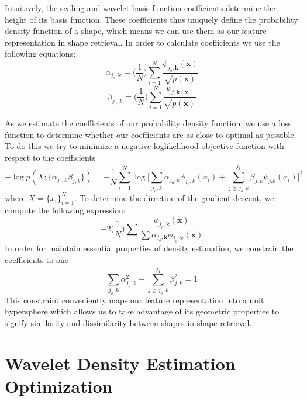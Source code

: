 \documentclass[../tech_report_1.tex]{subfiles}
\begin{document}
Intuitively, the scaling and wavelet basis
function coefficients determine the height of its basis function.
These coefficients thus uniquely define
the probability density function of a shape, which means we can use them as our feature representation
in shape retrieval. In order to calculate coefficients we use the
following equations:
\begin{equation}
\alpha_{j_{o},\mathbf{k}}=\bigg(\frac{1}{N}\bigg)\overset{N}{\underset{i=1}{\sum}}\frac{\phi_{j_{o},\mathbf{k}}(\mathbf{x})}{\sqrt{p(\mathbf{x})}}\label{eq:scalingCoeff}
\end{equation}
\begin{equation}
\beta_{j_{o},k}=\bigg(\frac{1}{N}\bigg)\underset{i=1}{\overset{N}{\sum}}\frac{\psi_{j,\mathbf{k}(\mathbf{x})}}{\sqrt{p(\mathbf{x})}}\label{eq:waveletCoeff}
\end{equation}

As we estimate the coefficients of our probability density function,
we use a loss function to determine whether our coefficients are as
close to optimal as possible. To do this we try to minimize a negative
loglikelihood objective function with respect to the coefficients
\begin{equation}
-\log p(X;\{\alpha_{j_{o},k}\beta_{j,k}\})=-\frac{1}{N}\underset{i=1}{\overset{N}{\sum}}\log\Bigg[\underset{j_{o},k}{\sum}\alpha_{j_{o},k}\phi_{j_{o},k}(x_{i})+\underset{j\geq j_{o},k}{\overset{j_{1}}{\sum}}\beta_{j,k}\psi_{j.k}(x_{i})\Bigg]^{2}\label{eq:costFunction}
\end{equation}
where $X=\{x_{i}\}_{i=1}^{N}$. To determine the direction
of the gradient descent, we compute the following expression:
\begin{equation}
-2\bigg(\frac{1}{N}\bigg)\sum\frac{\phi_{j_{o},\mathbf{k}}(\mathbf{x})}{\sum\alpha_{j_{o},\mathbf{k}}\phi_{j_{o},\mathbf{k}}(\mathbf{x})}\label{eq:gradient}
\end{equation}
In order for maintain essential properties of density estimation,
we constrain the coefficients to one
\begin{equation}
\underset{j_{o},k}{\sum}\alpha_{j_{o},k}^{2}+\underset{j\geq j_{o},k}{\overset{j_{1}}{\sum}}\beta_{j,k}^{2}=1\label{eq:constraint}
\end{equation}
This constraint conveniently maps our feature representation into
a unit hypersphere which allows us to take advantage of its geometric
properties to signify similarity and dissimilarity between shapes
in shape retrieval. 


\section*{Wavelet Density Estimation Optimization}
\end{document}
